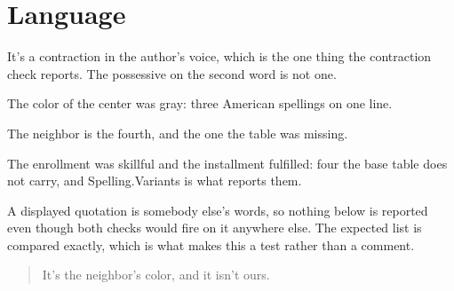 \section{Language}
\label{sec:ch01-language}

It's a contraction in the author's voice, which is the one thing the
contraction check reports. The possessive on the second word is not one.

The color of the center was gray: three American spellings on one line.

The neighbor is the fourth, and the one the table was missing.

The enrollment was skillful and the installment fulfilled: four the base table
does not carry, and Spelling.Variants is what reports them.

A displayed quotation is somebody else's words, so nothing below is reported
even though both checks would fire on it anywhere else. The expected list is
compared exactly, which is what makes this a test rather than a comment.

\begin{quote}
It's the neighbor's color, and it isn't ours.
\end{quote}
